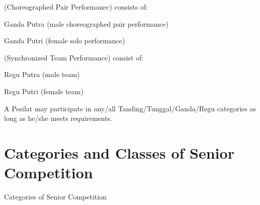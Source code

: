 \begin{legal}
\begin{legal}
    \item {} (Choreographed Pair Performanec) consists of:
        \begin{legal}
        \item Ganda Putra (male choreographed pair performance)
        \item Ganda Putri (female solo performance)
        \end{legal}

    \item {} (Synchronized Team Performance) consist of:
        \begin{legal}
        \item Regu Putra (male team)
        \item Regu Putri (female team)
        \end{legal}
    \end{legal}
\end{legal}

    A Pesilat may participate in any/all Tanding/Tunggal/Ganda/Regu categories as long as he/she 
    meets requirements.


\section{Categories and Classes of Senior Competition}
\label{sec:senior}

Categories of Senior Competition


